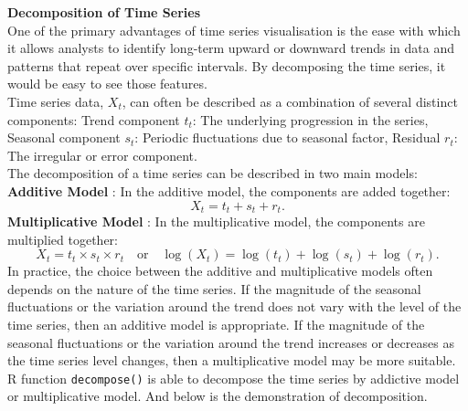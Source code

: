 \documentclass{article}\usepackage[]{graphicx}\usepackage[]{xcolor}
\begin{document}
\noindent
\textbf{Decomposition of Time Series}\\
\noindent
One of the primary advantages of time series visualisation is the ease with which it allows analysts to identify long-term upward or downward trends in data and patterns that repeat over specific intervals. By decomposing the time series, it would be easy to see those features.\\

\noindent
Time series data, $X_t$, can often be described as a combination of several distinct components: Trend component $t_t$: The underlying progression in the series, Seasonal component $s_t$: Periodic fluctuations due to seasonal factor, Residual $r_t$: The irregular or error component.\\

\noindent
The decomposition of a time series can be described in two main models:\\
\textbf{Additive Model} \cite{Brockwell2016Introduction}: In the additive model, the components are added together:
\[
X_t = t_t + s_t + r_t.
\]
\textbf{Multiplicative Model} \cite{Brockwell2016Introduction}: In the multiplicative model, the components are multiplied together:
\[
X_t = t_t \times s_t \times r_t \quad \text{or} \quad \log(X_t) = \log(t_t) + \log(s_t) + \log(r_t).
\]
In practice, the choice between the additive and multiplicative models often depends on the nature of the time series. If the magnitude of the seasonal fluctuations or the variation around the trend does not vary with the level of the time series, then an additive model is appropriate. If the magnitude of the seasonal fluctuations or the variation around the trend increases or decreases as the time series level changes, then a multiplicative model may be more suitable.\\

\noindent
R function \texttt{decompose()} is able to decompose the time series by addictive model or multiplicative model. And below is the demonstration of decomposition.
\end{document}

